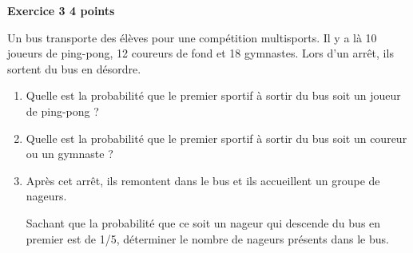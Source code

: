 \textbf{Exercice 3 \hfill 4 points}

\medskip

Un bus transporte des élèves pour une compétition multisports. Il y a là 10 joueurs de
ping-pong, 12 coureurs de fond et 18 gymnastes. Lors d'un arrêt, ils sortent du bus en
désordre.

\medskip

\begin{enumerate}
\item Quelle est la probabilité que le premier sportif à sortir du bus soit un joueur de ping-pong ?
\item Quelle est la probabilité que le premier sportif à sortir du bus soit un coureur ou un
gymnaste ?
\item Après cet arrêt, ils remontent dans le bus et ils accueillent un groupe de nageurs.

Sachant que la probabilité que ce soit un nageur qui descende du bus en premier
est de 1/5, déterminer le nombre de nageurs présents dans le bus.
\end{enumerate}

\vspace{0,5cm}


